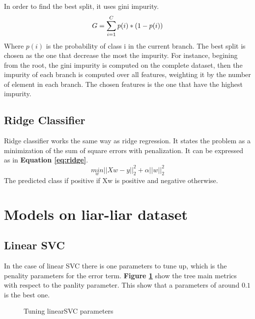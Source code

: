 In order to find the best split, it uses gini impurity. 
\begin{equation}
	G = \sum_{i=1}^C p(i) * (1-p(i))\\
\end{equation}
Where $p(i)$ is the probability of class i in the current branch. The best split is chosen as the one that decrease the most the impurity. For instance, begining from the root, the gini impurity is computed on the complete dataset, then the impurity of each branch is computed over all features, weighting it by the number of element in each branch. The chosen features is the one that have the highest impurity. 

\subsection{Ridge Classifier}
Ridge classifier works the same way as ridge regression. It states the problem as a minimization of the sum of square errors with penalization. It can be expressed as in \textbf{Equation \ref{eq:ridge}}.
\begin{equation}
	\underset{w}{min} ||Xw-y||^2_2 + \alpha ||w||^2_2 \label{eq:ridge}
\end{equation}
The predicted class if positive if Xw is positive and negative otherwise. 
\section{Models on liar-liar dataset}
\subsection{Linear SVC}
In the case of linear SVC there is one parameters to tune up, which is the penality parameters for the error term. \textbf{Figure \ref{fig:chap3:linearSVC}} show the tree main metrics with respect to the panlity parameter. This show that a parameters of around $0.1$ is the best one. 

\begin{figure}[]
	\centering
	\caption{Tuning linearSVC parameters }
	\label{fig:chap3:linearSVC}
\end{figure}

